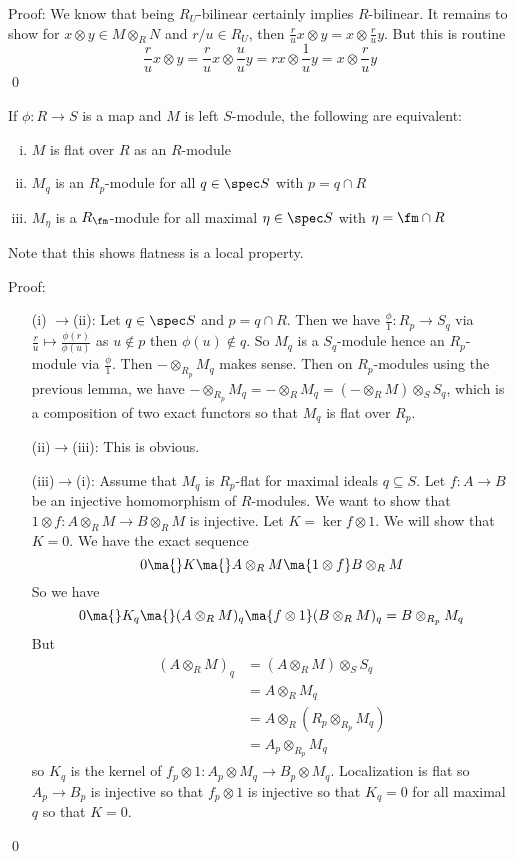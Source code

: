 \noindent Proof: We know that being $R_U$-bilinear certainly implies $R$-bilinear. It remains to show for $x \otimes y \in M \otimes_R N$ and $r/u \in R_U$, then $\frac{r}{u}x \otimes y=x \otimes \frac{r}{u} y$. But this is routine
\[
\frac{r}{u} x \otimes y= \frac{r}{u} x \otimes \frac{u}{u} y=rx \otimes \frac{1}{u} y= x \otimes \frac{r}{u} y
\]
\qed \\

\begin{thmm}
If $\phi: R \to S$ is a map and $M$ is left $S$-module, the following are equivalent:
\begin{enumerate}[(i)]
\item $M$ is flat over $R$ as an $R$-module
\item $M_q$ is an $R_p$-module for all $q \in \spec S$ with $p=q \cap R$
\item $M_\eta$ is a $R_\fm$-module for all maximal $\eta \in \spec S$ with $\eta=\fm \cap R$
\end{enumerate}
Note that this shows flatness is a local property. 
\end{thmm}

\noindent Proof: \\
\begin{enumerate}
\item[(i) $\to$(ii):] Let $q \in \spec S$ and $p=q \cap R$. Then we have $\frac{\phi}{1}: R_p \to S_q$ via $\frac{r}{u} \mapsto \frac{\phi(r)}{\phi(u)}$ as $u \notin p$ then $\phi(u) \notin q$. So $M_q$ is a $S_q$-module hence an $R_p$-module via $\frac{\phi}{1}$. Then $- \otimes_{R_p} M_q$ makes sense. Then on $R_p$-modules using the previous lemma, we have $- \otimes_{R_p} M_q= - \otimes_R M_q=(-\otimes_R M) \otimes_S S_q$, which is a composition of two exact functors so that $M_q$ is flat over $R_p$. 
\item[(ii)$\to$(iii):] This is obvious. 
\item[(iii)$\to$(i):] Assume that $M_q$ is $R_p$-flat for maximal ideals $q \subseteq S$. Let $f: A \to B$ be an injective homomorphism of $R$-modules. We want to show that $1 \otimes f: A \otimes_R M \to B\otimes_R M$ is injective. Let $K=\ker f \otimes 1$. We will show that $K=0$. We have the exact sequence
\[
0 \ma{} K \ma{} A \otimes_R M \ma{1 \otimes f} B \otimes_R M
\]
So we have
\[
0 \ma{} K_q \ma{} (A \otimes_R M)_q \ma{f \otimes 1} (B \otimes_R M)_q=B \otimes_{R_p} M_q
\]
But
\[
\begin{split}
(A \otimes_R M)_q&=(A \otimes_R M) \otimes_S S_q \\
&=A \otimes_R M_q \\
&=A \otimes_R (R_p \otimes_{R_p} M_q) \\
&=A_p \otimes_{R_p} M_q
\end{split}
\]
so $K_q$ is the kernel of $f_p \otimes 1: A_p \otimes M_q \to B_p \otimes M_q$. Localization is flat so $A_p \to B_p$ is injective so that $f_p \otimes 1$ is injective so that $K_q=0$ for all maximal $q$ so that $K=0$. 
\end{enumerate}
\qed \\


